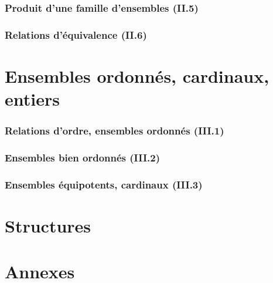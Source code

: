 \documentclass[11pt,a4paper]{article}
\theoremstyle{definition}
\begin{document}
\section{Produit d'une famille d'ensembles (II.5)}


\section{Relations d'équivalence (II.6)}


\part{Ensembles ordonnés, cardinaux, entiers}

\section{Relations d'ordre, ensembles ordonnés (III.1)}



\section{Ensembles bien ordonnés (III.2)}



\section{Ensembles équipotents, cardinaux (III.3)}








\part{Structures}


\part*{Annexes}




\clearpage

\end{document}
